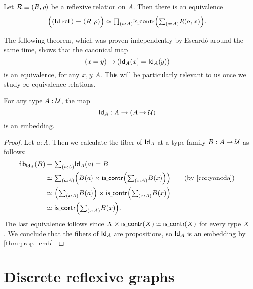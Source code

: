 \begin{cor}\label{cor:yoneda_rel}
Let $\mathcal{R}\equiv (R,\rho)$ be a reflexive relation on $A$.
Then there is an equivalence
\begin{equation*}
\eqv{\Big((\idtypevar,\refl{})=(R,\rho)\Big)}{\prd{a:A}\iscontr\Big(\sm{x:A}R(a,x)\Big)}.
\end{equation*}
\end{cor}

The following theorem, which was proven independently by Escardó \cite{Escardo2016} around the same time, shows that the canonical map
\begin{equation*}
(x=y)\to (\mathsf{Id}_{A}(x)=\mathsf{Id}_{A}(y))
\end{equation*}
is an equivalence, for any $x,y:A$. This will be particularly relevant to us once we study $\infty$-equivalence relations.

\begin{prp}
For any type $A:\mathcal{U}$, the map
\begin{equation*}
\mathsf{Id}_{A}:A\to (A\to\mathcal{U})
\end{equation*}
is an embedding.
\end{prp}

\begin{proof}
Let $a:A$. Then we calculate the fiber of $\mathsf{Id}_{A}$ at a type family $B:A\to \mathcal{U}$ as follows:
\begin{align*}
\fib{\idtypevar{A}}{B} & \jdeq \sm{a:A}\idtypevar{A}(a)=B \\
& \eqvsym \sm{a:A} \Big(B(a)\times\iscontr\Big(\sm{x:A}B(x)\Big)\Big) \tag{by \cref{cor:yoneda}}\\
& \eqvsym \Big(\sm{a:A}B(a)\Big)\times \iscontr\Big(\sm{x:A}B(x)\Big) \\
& \eqvsym \iscontr\Big(\sm{x:A}B(x)\Big).
\end{align*}
The last equivalence follows since $X\times \mathsf{is\underline{\ }{}contr}(X)\simeq \mathsf{is\underline{\ }{}contr}(X)$ for every type $X$. We conclude that the fibers of $\mathsf{Id}_{A}$ are propositions, so $\mathsf{Id}_{A}$ is an embedding by \cref{thm:prop_emb}.
\end{proof}

\section{Discrete reflexive graphs}


